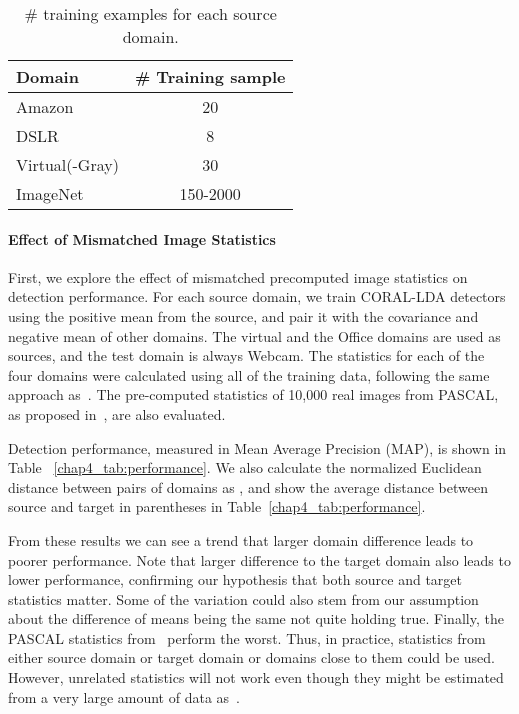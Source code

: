 \documentclass[graybox]{svmult}
\begin{document}
\begin{table}
\centering
\begin{small}
\begin{tabular}{|l|c|}
\hline
Domain & \# Training sample  \\
\hline \hline
Amazon & 20 \\ \hline
DSLR   & 8  \\ \hline
Virtual(-Gray) & 30 \\ \hline
ImageNet & 150-2000 \\
\hline
\end{tabular}
\caption{\small \# training examples for each source domain.}
\label{chap4_tab:ntrain}
\end{small}
\end{table}

\paragraph{\textbf{Effect of Mismatched Image Statistics}}
First, we explore the effect of mismatched precomputed image statistics on detection performance.
For each source domain, we train CORAL-LDA detectors using the positive mean from the source, and pair it with the covariance and negative mean of other domains. The virtual and the Office domains are used as sources, and the test domain is always Webcam. 
The statistics for each of the four domains were calculated using all of the training data,
following the same approach as~\cite{who}. The pre-computed statistics of 10,000 real images from PASCAL, as proposed in~\cite{who,ICRA14}, are also evaluated.

Detection performance, measured in Mean Average Precision (MAP), is shown in Table ~\ref{chap4_tab:performance}. We also calculate the normalized Euclidean distance between pairs of domains as , and show the average distance between source and target in parentheses in Table~\ref{chap4_tab:performance}.

From these results we can see a trend that larger domain difference leads to poorer performance. Note that larger difference to the target domain also leads to lower performance, confirming our hypothesis that both source and target statistics matter. Some of the variation could also stem from our assumption about the difference of means being the same not quite holding true. Finally, the PASCAL statistics from~\cite{who} perform the worst. Thus, in practice, statistics from either source domain or target domain or domains close to them could be used. However, unrelated statistics will not work even though they might be estimated from a very large amount of data as~\cite{who}. 
\end{document}
